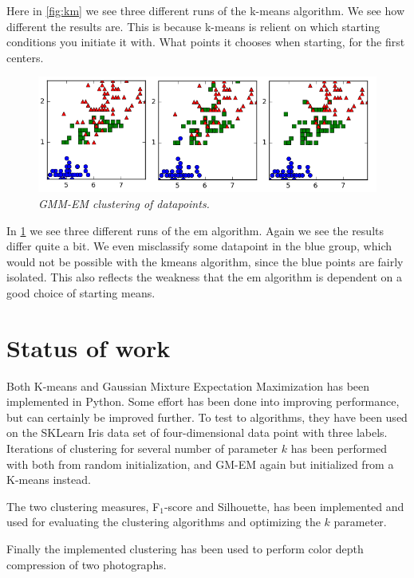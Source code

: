 \documentclass[a4paper,10pt,article,oneside,english]{memoir}
\let\oldcaption\caption
\renewcommand{\caption}[1]{\oldcaption{\emph{#1}}}
\begin{document}
Here in \ref{fig:km} we see three different runs of the k-means algorithm. We see how different the results are. This is because k-means is relient on which starting conditions you initiate it with. What points it chooses when starting, for the first centers.
\begin{figure}
	\centering
	\includegraphics[width=\textwidth]{em1.png}
	\caption{GMM-EM clustering of datapoints.}
	\label{fig:em}
\end{figure}
In \ref{fig:em} we see three different runs of the em algorithm. Again we see the results differ quite a bit. We even misclassify some datapoint in the blue group, which would not be possible with the kmeans algorithm, since the blue points are fairly isolated. This also reflects the weakness that the em algorithm is dependent on a good choice of starting means.

\section*{Status of work}
Both K-means and Gaussian Mixture Expectation Maximization has been implemented in Python. Some effort has been done into improving performance, but can certainly be improved further. To test to algorithms, they have been used on the SKLearn Iris data set of four-dimensional data point with three labels. Iterations of clustering for several number of parameter $k$ has been performed with both from random initialization, and GM-EM again but initialized from a K-means instead. 

The two clustering measures, F$_1$-score and Silhouette, has been implemented and used for evaluating the clustering algorithms and optimizing the $k$ parameter. 

Finally the implemented clustering has been used to perform color depth compression of two photographs. 
\end{document}
